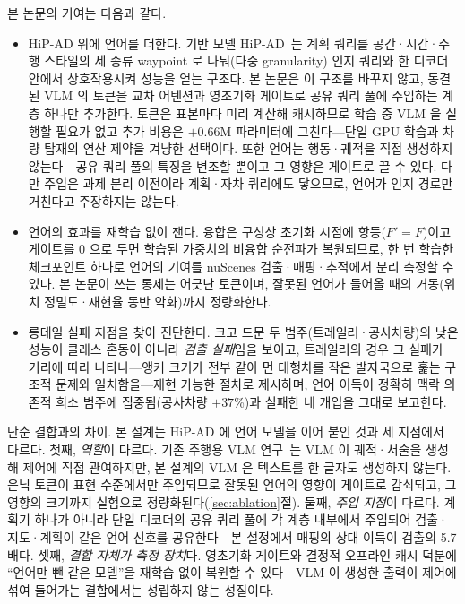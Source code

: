 \documentclass[conference]{IEEEtran}
\newcommand{\measured}[1]{#1}
\begin{document}
본 논문의 기여는 다음과 같다.
\begin{itemize}
  \item HiP-AD 위에 언어를 더한다. 기반 모델 HiP-AD~\cite{hipad2025}는 계획
        쿼리를 공간·시간·주행 스타일의 세 종류 waypoint 로 나눠(다중 granularity) 인지
        쿼리와 한 디코더 안에서 상호작용시켜 성능을 얻는 구조다. 본 논문은 이 구조를
        바꾸지 않고, 동결된 VLM 의 토큰을 교차 어텐션과 영초기화 게이트로 공유 쿼리 풀에
        주입하는 계층 하나만 추가한다. 토큰은 표본마다 미리 계산해 캐시하므로 학습 중
        VLM 을 실행할 필요가 없고 추가 비용은 $+0.66$M 파라미터에 그친다---단일 GPU
        학습과 차량 탑재의 연산 제약을 겨냥한 선택이다. 또한 언어는 행동·궤적을 직접
        생성하지 않는다---공유 쿼리 풀의 특징을 변조할 뿐이고 그 영향은 게이트로 끌 수
        있다. 다만 주입은 과제 분리 이전이라 계획·자차 쿼리에도 닿으므로, 언어가 인지
        경로만 거친다고 주장하지는 않는다.
  \item 언어의 효과를 재학습 없이 잰다. 융합은 구성상 초기화 시점에 항등($F'{=}F$)이고
        게이트를 $0$ 으로 두면 학습된 가중치의 비융합 순전파가 복원되므로, 한 번 학습한
        체크포인트 하나로 언어의 기여를 nuScenes 검출·매핑·추적에서 분리 측정할 수 있다.
        본 논문이 쓰는 통제는 어긋난 토큰이며, 잘못된 언어가 들어올 때의 거동(위치
        정밀도·재현율 동반 악화)까지 정량화한다.
  \item 롱테일 실패 지점을 찾아 진단한다. 크고 드문 두 범주(트레일러·공사차량)의
        낮은 성능이 클래스 혼동이 아니라 \emph{검출 실패}임을 보이고, 트레일러의 경우
        그 실패가 거리에 따라 나타나---앵커 크기가 전부 같아 먼 대형차를 작은 발자국으로
        훑는 구조적 문제와 일치함을---재현 가능한 절차로 제시하며, 언어 이득이 정확히 맥락 의존적
        희소 범주에 집중됨(공사차량 $+37$\%)과 실패한 네 개입을 그대로 보고한다.
\end{itemize}

단순 결합과의 차이. 본 설계는 HiP-AD 에 언어 모델을 이어 붙인 것과 세 지점에서
다르다. 첫째, \emph{역할}이 다르다. 기존 주행용 VLM
연구~\cite{tian2024drivevlm,xu2024drivegpt4,sima2024drivelm}는 VLM 이 궤적·서술을
생성해 제어에 직접 관여하지만, 본 설계의 VLM 은 텍스트를 한 글자도 생성하지 않는다.
은닉 토큰이 표현 수준에서만 주입되므로 잘못된 언어의 영향이 게이트로 감쇠되고, 그
영향의 크기까지 실험으로 정량화된다(\ref{sec:ablation}절). 둘째,
\emph{주입 지점}이 다르다. 계획기 하나가 아니라 단일 디코더의 공유 쿼리 풀에 각 계층
내부에서 주입되어 검출·지도·계획이 같은 언어 신호를 공유한다---본 설정에서 매핑의
상대 이득이 검출의 \measured{5.7}배다. 셋째, \emph{결합 자체가 측정 장치}다.
영초기화 게이트와 결정적 오프라인 캐시 덕분에 ``언어만 뺀 같은 모델''을 재학습 없이
복원할 수 있다---VLM 이 생성한 출력이 제어에 섞여 들어가는 결합에서는 성립하지 않는
성질이다.
\end{document}
